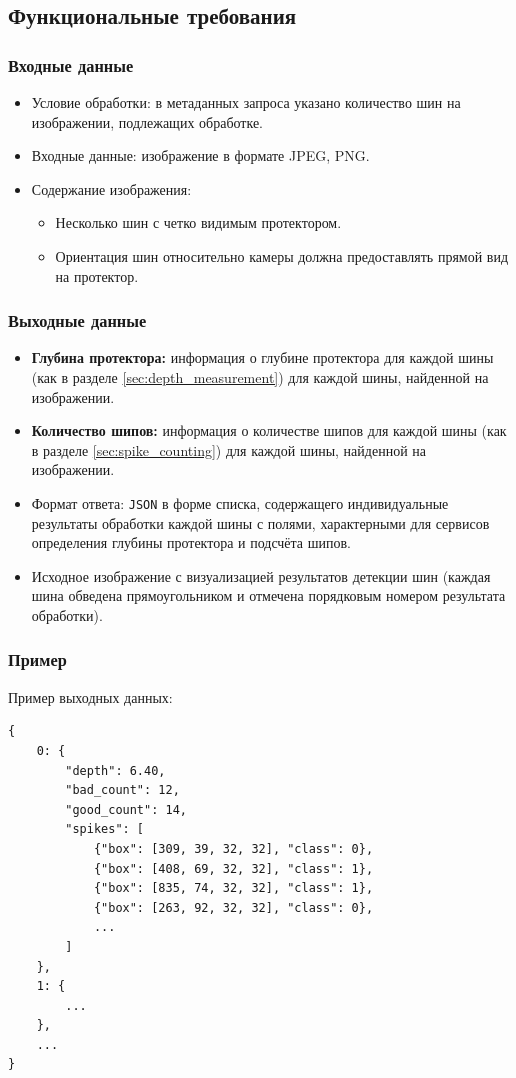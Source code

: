 \documentclass[12pt]{article}
\begin{document}
\subsection{Функциональные требования}

\subsubsection{Входные данные}
\begin{itemize}
	\item Условие обработки: в метаданных запроса указано количество шин на изображении, подлежащих обработке.
	\item Входные данные: изображение в формате JPEG, PNG.
	\item Содержание изображения:
	      \begin{itemize}
		      \item Несколько шин с четко видимым протектором.
		      \item Ориентация шин относительно камеры должна предоставлять прямой вид на протектор.
	      \end{itemize}
\end{itemize}

\subsubsection{Выходные данные}
\begin{itemize}
	\item \textbf{Глубина протектора:} информация о глубине протектора для каждой шины (как в разделе \ref{sec:depth_measurement}) для каждой шины, найденной на изображении.
	\item \textbf{Количество шипов:} информация о количестве шипов для каждой шины (как в разделе \ref{sec:spike_counting}) для каждой шины, найденной на изображении.
	\item Формат ответа: \texttt{JSON} в форме списка, содержащего индивидуальные результаты обработки каждой шины с полями, характерными для сервисов определения глубины протектора и подсчёта шипов.
	\item Исходное изображение с визуализацией результатов детекции шин (каждая шина обведена прямоугольником и отмечена порядковым номером результата обработки).
\end{itemize}

\subsubsection{Пример}
Пример выходных данных:
\begin{verbatim}
{
	0: {
		"depth": 6.40,
		"bad_count": 12,
		"good_count": 14,
		"spikes": [
			{"box": [309, 39, 32, 32], "class": 0},
			{"box": [408, 69, 32, 32], "class": 1},
			{"box": [835, 74, 32, 32], "class": 1},
			{"box": [263, 92, 32, 32], "class": 0},
			...
		]
	},
	1: {
		...
	},
	...
}
\end{verbatim}
\end{document}
